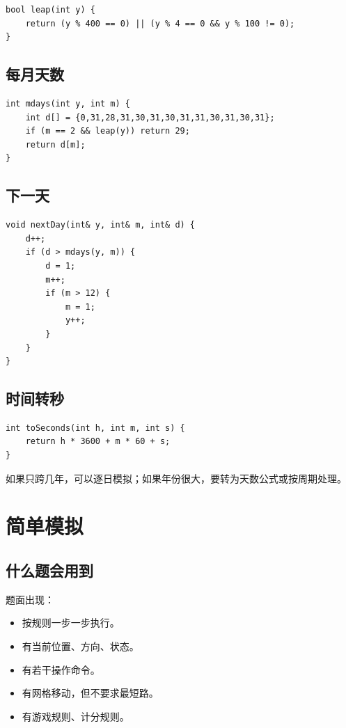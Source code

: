 \begin{lstlisting}
bool leap(int y) {
    return (y % 400 == 0) || (y % 4 == 0 && y % 100 != 0);
}
\end{lstlisting}

\subsection{每月天数}

\begin{lstlisting}
int mdays(int y, int m) {
    int d[] = {0,31,28,31,30,31,30,31,31,30,31,30,31};
    if (m == 2 && leap(y)) return 29;
    return d[m];
}
\end{lstlisting}

\subsection{下一天}

\begin{lstlisting}
void nextDay(int& y, int& m, int& d) {
    d++;
    if (d > mdays(y, m)) {
        d = 1;
        m++;
        if (m > 12) {
            m = 1;
            y++;
        }
    }
}
\end{lstlisting}

\subsection{时间转秒}

\begin{lstlisting}
int toSeconds(int h, int m, int s) {
    return h * 3600 + m * 60 + s;
}
\end{lstlisting}

如果只跨几年，可以逐日模拟；如果年份很大，要转为天数公式或按周期处理。

\section{简单模拟}\label{sec:05-15}

\subsection{什么题会用到}

题面出现：

\begin{itemize}
  \item 按规则一步一步执行。
  \item 有当前位置、方向、状态。
  \item 有若干操作命令。
  \item 有网格移动，但不要求最短路。
  \item 有游戏规则、计分规则。
\end{itemize}

